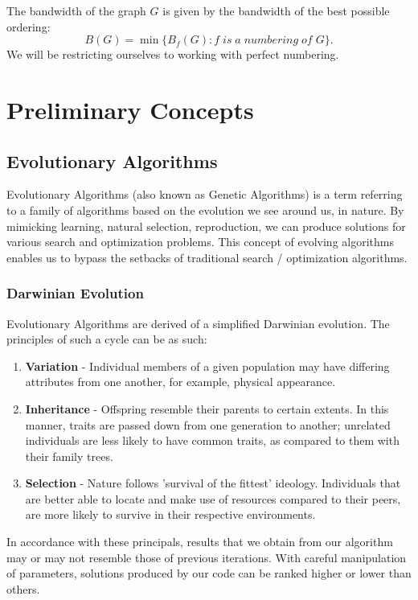\documentclass[conference,compsoc]{IEEEtran}
\begin{document}
The bandwidth of the graph $G$ is given by the bandwidth of the best possible ordering:
\begin{equation}
B(G) = \min\{B_f(G): f\; is\; a \;numbering\; of\; G\}.    
\end{equation}
We will be restricting ourselves to working with perfect numbering.

\section{Preliminary Concepts}
\subsection{Evolutionary Algorithms}
Evolutionary Algorithms (also known as Genetic Algorithms) is a term referring to a family of algorithms based on the evolution we see around us, in nature. By mimicking learning, natural selection, reproduction, we can produce solutions for various search and optimization problems. This concept of evolving algorithms enables us to bypass the setbacks of traditional search / optimization algorithms.

\subsubsection{Darwinian Evolution}
Evolutionary Algorithms are derived of a simplified Darwinian evolution. The principles of such a cycle can be as such:
\begin{enumerate}
    \item \textbf{Variation} - Individual members of a given population may have differing attributes from one another, for example, physical appearance.
    \item \textbf{Inheritance} - Offspring resemble their parents to certain extents. In this manner, traits are passed down from one generation to another; unrelated individuals are less likely to have common traits, as compared to them with their family trees.
    \item \textbf{Selection} - Nature follows 'survival of the fittest' ideology. Individuals that are better able to locate and make use of resources compared to their peers, are more likely to survive in their respective environments. 
\end{enumerate}
In accordance with these principals, results that we obtain from our algorithm may or may not resemble those of previous iterations. With careful manipulation of parameters, solutions produced by our code can be ranked higher or lower than others.
\end{document}
